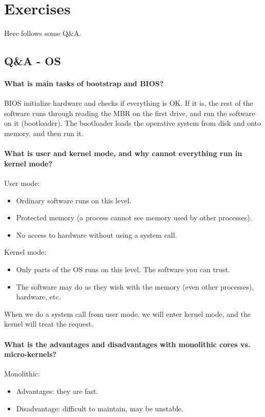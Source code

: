 \documentclass[11pt,a4paper]{article}
\begin{document}
\section{Exercises}
Here follows some Q\&A.

\subsection{Q\&A - OS}
\paragraph{What is main tasks of bootstrap and BIOS?}
BIOS initialize hardware and checks if everything is OK. If it is, the rest of the software runs through reading the MBR on the first drive, and run the software on it (bootloader). The bootloader loads the operative system from disk and onto memory, and then run it.

\paragraph{What is user and kernel mode, and why cannot everything run in kernel mode?}
User mode: 
\begin{itemize}
\item{Ordinary software runs on this level.}
\item{Protected memory (a process cannot see memory used by other processes).}
\item{No access to hardware without using a system call.}
\end{itemize}

Kernel mode:
\begin{itemize}
\item{Only parts of the OS runs on this level. The software you can trust.}
\item{The software may do as they wish with the memory (even other processes), hardware, etc.}
\end{itemize}

When we do a system call from user mode, we will enter kernel mode, and the kernel will treat the request. 

\paragraph{What is the advantages and disadvantages with monolithic cores vs. micro-kernels?}
Monolithic:
\begin{itemize}
\item{Advantages: they are fast.}
\item{Disadvantage: difficult to maintain, may be unstable.}
\end{itemize}
\end{document}
